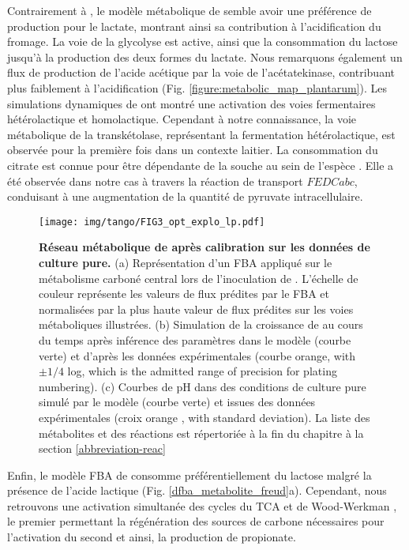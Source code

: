 Contrairement à \lactis, le modèle métabolique de \plantarum semble avoir une préférence de production pour le lactate, montrant ainsi sa contribution à l'acidification du fromage. La voie de la glycolyse est active, ainsi que la consommation du lactose jusqu'à la production des deux formes du lactate. Nous remarquons également un flux de production de l'acide acétique par la voie de l'acétatekinase, contribuant plus faiblement à l'acidification (Fig. \ref{figure:metabolic_map_plantarum}). Les simulations dynamiques de \plantarum ont montré une activation des voies fermentaires hétérolactique et homolactique. Cependant à notre connaissance, la voie métabolique de la transkétolase, représentant la fermentation hétérolactique, est observée pour la première fois dans un contexte laitier. La consommation du citrate est connue pour être dépendante de la souche au sein de l'espèce \plantarum \citep{Palles1998}. Elle a été observée dans notre cas à travers la réaction de transport $FEDCabc$, conduisant à une augmentation de la quantité de pyruvate intracellulaire. \\

\begin{figure}[h!]
    \centering
    \texttt{[image: img/tango/FIG3\_opt\_explo\_lp.pdf]}
    \caption{\textbf{Réseau métabolique de \plantarum après calibration sur les données de culture pure.} (a) Représentation d'un FBA appliqué sur le métabolisme carboné central lors de l'inoculation de \plantarum. L'échelle de couleur représente les valeurs de flux prédites par le FBA et normalisées par la plus haute valeur de flux prédites sur les voies métaboliques illustrées. (b) Simulation de la croissance de \plantarum au cours du temps après inférence des paramètres dans le modèle (courbe verte) et d'après les données expérimentales (courbe orange, with $\pm 1/4$ log, which is the admitted range of precision for plating numbering). (c) Courbes de pH dans des conditions de culture pure simulé par le modèle (courbe verte) et issues des données expérimentales (croix orange , with standard deviation). La liste des métabolites et des réactions est répertoriée à la fin du chapitre à la section \ref{abbreviation-reac}}
    \label{dfba_metabolite_plant}
\end{figure}

 
Enfin, le modèle FBA de \freud consomme préférentiellement du lactose malgré la présence de l'acide lactique (Fig. \ref{dfba_metabolite_freud}a). Cependant, nous retrouvons une activation simultanée des cycles du TCA et de Wood-Werkman \citep{Deborde2000}, le premier permettant la régénération des sources de carbone nécessaires pour l'activation du second et ainsi, la production de propionate.

